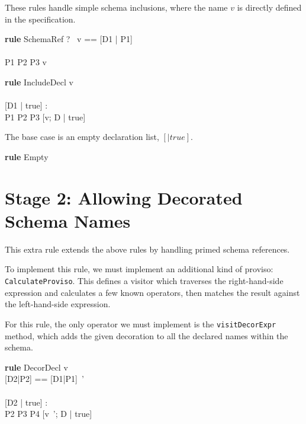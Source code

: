 \documentclass{article}
\newenvironment{zedrule}[1]{\par\textbf{rule }#1\vspace{-1ex}\infrule}{\endinfrule}
\newcommand{\derives}{\derive{}}
\newcommand{\proviso}{\raisebox{0.5ex}{${}_{\blacktriangleright}\ $}}%
\begin{document}
These rules handle simple schema inclusions, where the name $v$ is
directly defined in the specification.

\begin{zedrule}{SchemaRef}
  \proviso ?~ v == [D1 | P1] \\
  [D1 | true] \unfoldsTo [D2 | P2] \\
  P1 \land P2 \iff P3
\derives
  v \unfoldsTo [D2 | P3]
\end{zedrule}


\begin{zedrule}{IncludeDecl}
   v \unfoldsTo [D1 | P1] \\
   [D | true] \unfoldsTo [D2 | P2] \\
   \proviso [D1 | true] \land [D2 | true] : \power [D3] \\
   P1 \land P2 \iff P3
\derives
   [v; D | true] \unfoldsTo [D3 | P3]
\end{zedrule}

The base case is an empty declaration list, $[|true]$.
\begin{zedrule}{Empty}
   [~ | true] \unfoldsTo [~ | true]
\end{zedrule}


\section*{Stage 2: Allowing Decorated Schema Names}

This extra rule extends the above rules by handling primed schema
references.

To implement this rule, we must implement an additional kind of
proviso: \verb!CalculateProviso!.  This defines a visitor which
traverses the right-hand-side expression and calculates a few known
operators, then matches the result against the left-hand-side expression.

For this rule, the only operator we must implement is the
\verb!visitDecorExpr! method, which adds the given decoration to all the
declared names within the schema.

\begin{zedrule}{DecorDecl}
   v \unfoldsTo [D1 | P1] \\
   \proviso [D2|P2] == [D1|P1]~' \\
   [D | true] \unfoldsTo [D3 | P3] \\
   \proviso [D2 | true] \land [D3 | true] : \power [D4] \\
   P2 \land P3 \iff P4
\derives
   [v~'; D | true] \unfoldsTo [D4 | P4]
\end{zedrule}
\end{document}
